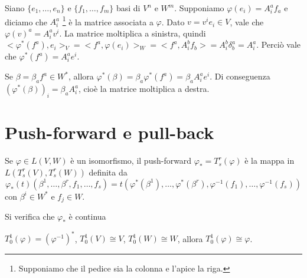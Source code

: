 Siano $\{e_1,\dots, e_n\}$ e $\{f_1,\dots, f_m\}$ basi di $V^n$ e $W^m$. Supponiamo $\varphi(e_i) = A_i^af_a$ e diciamo che $A_i^a$ \footnote{Supponiamo che il pedice sia la colonna e l'apice la riga.} è la matrice associata a $\varphi$. %
Dato $v = v^ie_i\in V$, vale che $\varphi(v)^a = A_i^a v^i$.
La matrice moltiplica a sinistra, quindi $<\varphi^*(f^a), e_i>_V = <f^a, \varphi(e_i)>_W = <f^a, A_i^b f_b> = A_i^b\delta_b^a = A_i^a$. Perciò vale che $\varphi^*(f^a) = A_i^a e^i$.

Se $\beta = \beta_a f^a \in W^*$, allora $\varphi^*(\beta) = \beta_a \varphi^*(f^a) = \beta_aA_i^ae^i$.
Di conseguenza $(\varphi^*(\beta))_i = \beta_aA_i^a$, cioè la matrice moltiplica a destra.

\section{Push-forward e pull-back}

\begin{definition}
	Se $\varphi \in L(V,W)$ è un isomorfismo, il push-forward $\varphi_* = T_s^r(\varphi)$ è la mappa in $L(T_s^r(V), T_s^r(W))$ definita da
	\begin{equation*}
		\varphi_*(t) (\beta^1,\dots,\beta^r,f_1,\dots,f_s) = t(\varphi^*(\beta^1),\dots,\varphi^*(\beta^r), \varphi^{-1}(f_1),\dots, \varphi^{-1}(f_s))
	\end{equation*}
	con $\beta^i\in W^*$ e $f_j\in W$.
\end{definition}

Si verifica che $\varphi_*$ è continua

\begin{remark}
	$T_0^1(\varphi) = (\varphi^{-1})^*$, $T_0^1(V)\cong V$, $T_0^1(W)\cong W$, allora $T_0^1(\varphi)\cong\varphi$.
\end{remark}


